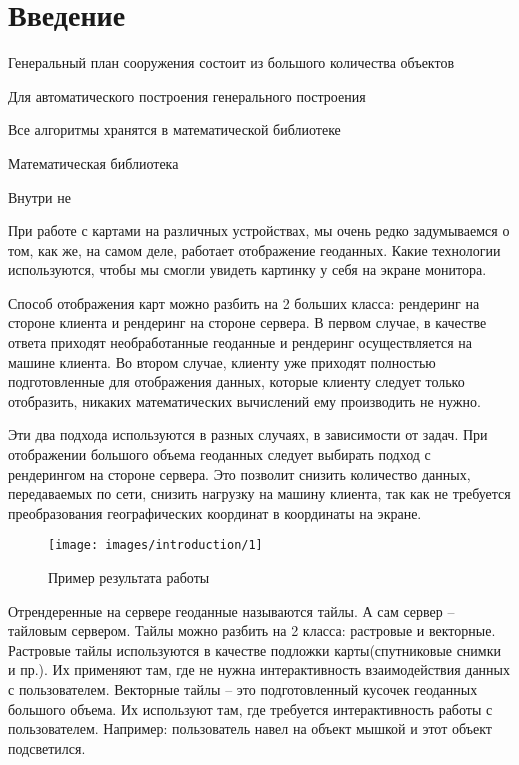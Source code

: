 \section*{\Large{Введение}}
Генеральный план сооружения состоит из большого количества объектов









Для автоматического построения генерального построения

Все алгоритмы хранятся в математической библиотеке

Математическая библиотека

Внутри не






При работе с картами на различных устройствах, мы очень редко задумываемся о том, как же, на самом деле,
работает отображение геоданных. Какие технологии используются, чтобы мы смогли увидеть картинку у себя на экране
монитора.

Способ отображения карт можно разбить на 2 больших класса: рендеринг на стороне клиента и рендеринг на стороне
сервера.
В первом случае, в качестве ответа приходят необработанные геоданные и рендеринг осуществляется на машине клиента.
Во втором случае, клиенту уже приходят полностью подготовленные для отображения данных,
которые клиенту следует только отобразить,
никаких математических вычислений ему производить не нужно.

Эти два подхода используются в разных случаях, в зависимости от задач.
При отображении большого объема геоданных следует выбирать подход с рендерингом
на стороне сервера. Это позволит снизить количество данных, передаваемых по сети, снизить нагрузку на
машину клиента, так как не требуется преобразования географических координат в координаты на экране.

\begin{wrapfigure}{r}[0pt]{0.4\textwidth}
    \begin{center}
        \texttt{[image: images/introduction/1]}
    \end{center}
    \caption{Пример результата работы}
    \label{pic:problem__site-plan}
\end{wrapfigure}
Отрендеренные на сервере геоданные называются тайлы. А сам сервер -- тайловым сервером.
Тайлы можно разбить на 2 класса: растровые и векторные. Растровые тайлы используются в качестве
подложки карты(спутниковые снимки и пр.). Их применяют там, где не нужна интерактивность взаимодействия данных
с пользователем. Векторные тайлы -- это подготовленный кусочек геоданных большого объема. Их используют там, где
требуется интерактивность работы с пользователем. Например: пользователь навел на объект мышкой и этот объект подсветился.

